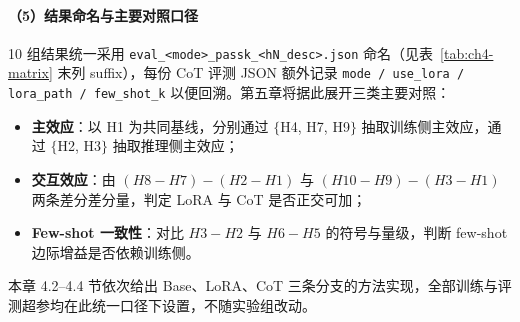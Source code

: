 \paragraph{（5）结果命名与主要对照口径}
10 组结果统一采用 \texttt{eval\_<mode>\_passk\_<hN\_desc>.json} 命名（见表~\ref{tab:ch4-matrix} 末列 suffix），每份 CoT 评测 JSON 额外记录 \texttt{mode / use\_lora / lora\_path / few\_shot\_k} 以便回溯。第五章将据此展开三类主要对照：
\begin{itemize}
    \item \textbf{主效应}：以 H1 为共同基线，分别通过 $\{$H4, H7, H9$\}$ 抽取训练侧主效应，通过 $\{$H2, H3$\}$ 抽取推理侧主效应；
    \item \textbf{交互效应}：由 $(H8-H7)-(H2-H1)$ 与 $(H10-H9)-(H3-H1)$ 两条差分差分量，判定 LoRA 与 CoT 是否正交可加；
    \item \textbf{Few-shot 一致性}：对比 $H3-H2$ 与 $H6-H5$ 的符号与量级，判断 few-shot 边际增益是否依赖训练侧。
\end{itemize}
本章 4.2--4.4 节依次给出 Base、LoRA、CoT 三条分支的方法实现，全部训练与评测超参均在此统一口径下设置，不随实验组改动。
